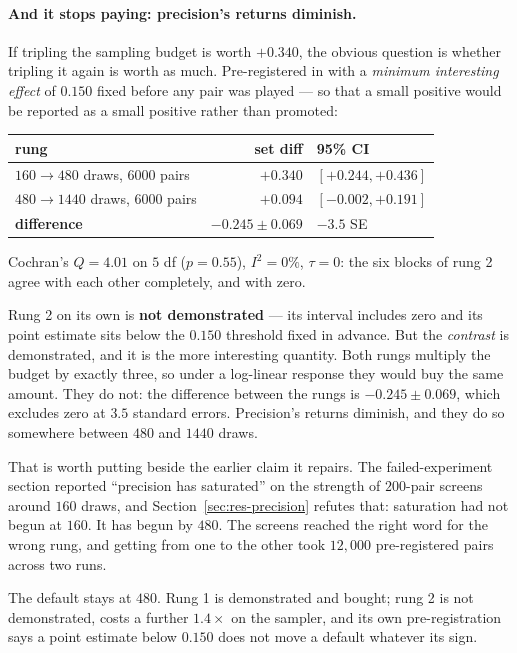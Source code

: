 \documentclass[11pt,a4paper]{article}
\begin{document}
\paragraph{And it stops paying: precision's returns diminish.} If tripling the
sampling budget is worth $+0.340$, the obvious question is whether tripling it
again is worth as much. Pre-registered in
 with a \emph{minimum interesting
effect} of $0.150$ fixed before any pair was played --- so that a small positive
would be reported as a small positive rather than promoted:
\begin{center}
\begin{tabular}{lrl}
\toprule
rung & set diff & 95\% CI \\
\midrule
$160 \to 480$ draws, 6000 pairs & $\mathbf{+0.340}$ & $[+0.244, +0.436]$ \\
$480 \to 1440$ draws, 6000 pairs & $+0.094$ & $[-0.002, +0.191]$ \\
\midrule
\textbf{difference} & $\mathbf{-0.245 \pm 0.069}$ & $\mathbf{-3.5}$ SE \\
\bottomrule
\end{tabular}
\end{center}
Cochran's $Q = 4.01$ on $5$ df ($p = 0.55$), $I^2 = 0\%$, $\tau = 0$: the six
blocks of rung 2 agree with each other completely, and with zero.

Rung 2 on its own is \textbf{not demonstrated} --- its interval includes zero
and its point estimate sits below the $0.150$ threshold fixed in advance. But
the \emph{contrast} is demonstrated, and it is the more interesting quantity.
Both rungs multiply the budget by exactly three, so under a log-linear response
they would buy the same amount. They do not: the difference between the rungs
is $-0.245 \pm 0.069$, which excludes zero at $3.5$ standard errors.
Precision's returns diminish, and they do so somewhere between $480$ and $1440$
draws.

That is worth putting beside the earlier claim it repairs. The failed-experiment
section reported ``precision has saturated'' on the strength of $200$-pair
screens around $160$ draws, and Section~\ref{sec:res-precision} refutes that:
saturation had not begun at $160$. It has begun by $480$. The screens reached
the right word for the wrong rung, and getting from one to the other took
$12{,}000$ pre-registered pairs across two runs.

The default stays at $480$. Rung 1 is demonstrated and bought; rung 2 is not
demonstrated, costs a further $1.4\times$ on the sampler, and its own
pre-registration says a point estimate below $0.150$ does not move a default
whatever its sign.
\end{document}
